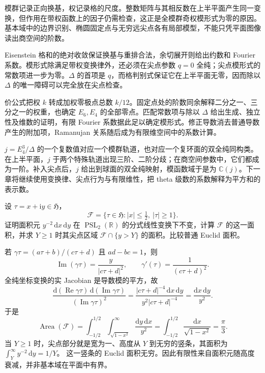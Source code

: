 \begin{chaptersummary}
模群记录正向换基，权记录格的尺度。整数矩阵与其相反数在上半平面产生同一变换，但作用在带权函数上的因子仍需检查，这正是全模群奇权模形式为零的原因。基本域中的边界识别、椭圆固定点与无穷远尖点各有局部模型，不能只凭平面图像读出商空间的阶数。

\ProseParagraphBreak
Eisenstein 格和的绝对收敛保证换基与重排合法，余切展开则给出约数和 Fourier 系数。模形式除满足带权变换律外，还必须在尖点参数 \(q=0\) 全纯；尖点模形式的常数项进一步为零。\(\Delta\) 的首项是 \(q\)，而格判别式保证它在上半平面无零，因而除以 \(\Delta\) 的唯一障碍可以完全放在尖点检查。

\ProseParagraphBreak
价公式把权 \(k\) 转成加权零极点总数 \(k/12\)。固定点处的阶数同余解释二分之一、三分之一的权重，也确定 \(E_6,E_4\) 的全部零点。匹配常数项与除以 \(\Delta\) 给出生成、独立性及维数的证明，有限 Fourier 系数据此足以确定模形式。修正导数消去普通导数产生的附加项，Ramanujan 关系随后成为有限维空间中的系数计算。

\ProseParagraphBreak
\(j=E_4^3/\Delta\) 的一个复数值对应一个模群轨道，也对应一个复环面的双全纯同构类。在上半平面，\(j\) 于两个特殊轨道出现三阶、二阶分歧；在商空间参数中，它们都成为一阶。补入尖点后，\(j\) 给出到球面的双全纯映射，模函数域于是为 \(\mathbb C(j)\)。下一章将继续使用变换律、尖点行为与有限维性，把 theta 级数的系数解释为平方和的表示数。
\end{chaptersummary}

\BookExercises

\begin{exercise}\label{b3:ex:23-1}
设 \(\tau=x+\mathrm{i}y\in\mathfrak H\)，
\[
\mathcal F=\{\tau\in\mathfrak H:|x|\le\tfrac12,\ |\tau|\ge1\}.
\]
证明面积元 \(y^{-2}\,\mathrm{d}x\,\mathrm{d}y\) 在 \(\operatorname{PSL}_2(\mathbb R)\) 的分式线性变换下不变，计算 \(\mathcal F\) 的这一面积，并求 \(Y\ge1\) 时其尖点区域 \(\mathcal F\cap\{y>Y\}\) 的面积。比较普通 Euclid 面积。
\end{exercise}
\begin{solution}
若 \(\gamma\tau=(a\tau+b)/(c\tau+d)\) 且 \(ad-bc=1\)，则
\[
\operatorname{Im}(\gamma\tau)=\frac{y}{|c\tau+d|^2},
\qquad
\gamma'(\tau)=\frac1{(c\tau+d)^2}.
\]
全纯坐标变换的实 Jacobian 是导数模的平方，故
\[
\frac{\mathrm{d}(\operatorname{Re}\gamma\tau)\,
      \mathrm{d}(\operatorname{Im}\gamma\tau)}
     {(\operatorname{Im}\gamma\tau)^2}
=\frac{|c\tau+d|^{-4}\,\mathrm{d}x\,\mathrm{d}y}
       {y^2|c\tau+d|^{-4}}
=\frac{\mathrm{d}x\,\mathrm{d}y}{y^2}.
\]
于是
\[
\operatorname{Area}(\mathcal F)
=\int_{-1/2}^{1/2}\int_{\sqrt{1-x^2}}^\infty
       \frac{\mathrm{d}y\,\mathrm{d}x}{y^2}
=\int_{-1/2}^{1/2}\frac{\mathrm{d}x}{\sqrt{1-x^2}}
=\frac{\pi}{3}.
\]
当 \(Y\ge1\) 时，尖点部分就是宽为一、高度从 \(Y\) 到无穷的竖条，其面积为
\(\int_Y^\infty y^{-2}\,\mathrm{d}y=1/Y\)。
这一竖条的 Euclid 面积无穷。因此有限性来自面积元随高度衰减，并非基本域在平面中有界。
\end{solution}


